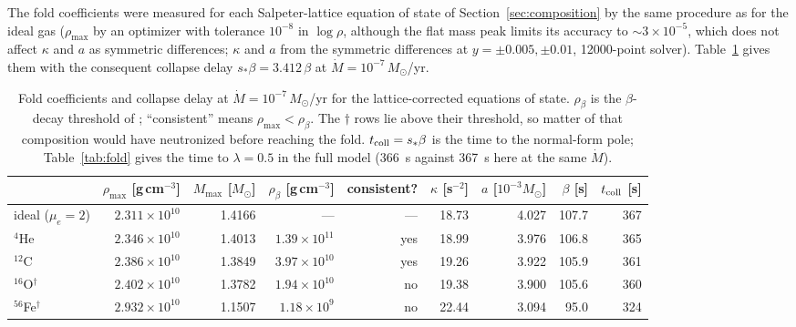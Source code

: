 \documentclass[11pt]{article}
\begin{document}
The fold coefficients were measured for each Salpeter-lattice equation of state of Section~\ref{sec:composition} by the same procedure as for the ideal gas ($\rho_{\max}$ by an optimizer with tolerance $10^{-8}$ in $\log\rho$, although the flat mass peak limits its accuracy to $\sim3\times10^{-5}$, which does not affect $\kappa$ and $a$ as symmetric differences; $\kappa$ and $a$ from the symmetric differences at $y=\pm0.005,\pm0.01$, 12000-point solver). Table~\ref{tab:foldcomp} gives them with the consequent collapse delay $s_*\beta=3.412\,\beta$ at $\dot M=10^{-7}\,M_\odot$/yr.
\begin{table}[ht]
\centering\scriptsize
\begin{tabular}{lrrrrrrrr}
\hline
 & $\rho_{\max}$ [g\,cm$^{-3}$] & $M_{\max}$ [$M_\odot$] & $\rho_\beta$ [g\,cm$^{-3}$] & consistent? & $\kappa$ [s$^{-2}$] & $a$ [$10^{-3}M_\odot$] & $\beta$ [s] & $t_{\rm coll}$ [s]\\
\hline
ideal ($\mu_e=2$) & $2.311\times10^{10}$ & 1.4166 & --- & --- & 18.73 & 4.027 & 107.7 & 367\\
$^{4}$He & $2.346\times10^{10}$ & 1.4013 & $1.39\times10^{11}$ & yes & 18.99 & 3.976 & 106.8 & 365\\
$^{12}$C & $2.386\times10^{10}$ & 1.3849 & $3.97\times10^{10}$ & yes & 19.26 & 3.922 & 105.9 & 361\\
$^{16}$O$^\dagger$ & $2.402\times10^{10}$ & 1.3782 & $1.94\times10^{10}$ & no & 19.38 & 3.900 & 105.6 & 360\\
$^{56}$Fe$^\dagger$ & $2.932\times10^{10}$ & 1.1507 & $1.18\times10^{9}$ & no & 22.44 & 3.094 & 95.0 & 324\\
\hline
\end{tabular}
\caption{Fold coefficients and collapse delay at $\dot M=10^{-7}\,M_\odot$/yr for the lattice-corrected equations of state. $\rho_\beta$ is the $\beta$-decay threshold of \citet[Table~II]{RotondoRRX2011}; ``consistent'' means $\rho_{\max}<\rho_\beta$. The $\dagger$ rows lie above their threshold, so matter of that composition would have neutronized before reaching the fold. $t_{\rm coll}=s_*\beta$ is the time to the normal-form pole; Table~\ref{tab:fold} gives the time to $\lambda=0.5$ in the full model (366~s against 367~s here at the same $\dot M$).}
\label{tab:foldcomp}
\end{table}
\end{document}
